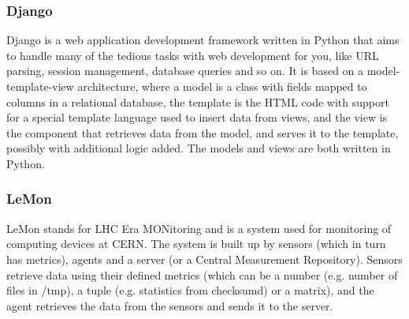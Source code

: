 \subsubsection{Django}
Django is a web application development framework written in Python that aims to handle many of the tedious tasks with web development for you, like URL parsing, session management, database queries and so on.\cite{django} It is based on a model-template-view architecture, where a model is a class with fields mapped to columns in a relational database, the template is the HTML code with support for a special template language used to insert data from views, and the view is the component that retrieves data from the model, and serves it to the template, possibly with additional logic added. The models and views are both written in Python.

\subsubsection{LeMon}
LeMon stands for LHC Era MONitoring and is a system used for monitoring of computing devices at CERN. The system is built up by sensors (which in turn has metrics), agents and a server (or a Central Measurement Repository). Sensors retrieve data using their defined metrics (which can be a number (e.g. number of files in /tmp), a tuple (e.g. statistics from checksumd) or a matrix), and the agent retrieves the data from the sensors and sends it to the server. 

